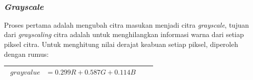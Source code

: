 \begin{adjustbox}{width=1\textwidth}
	\noindent\begin{minipage}{\linewidth}
		\label{fig:SkemaAlurPendeteksianPlat}
	\end{minipage}
\end{adjustbox}\\

\subsubsection{\textit{Grayscale}}
\noindent Proses pertama adalah mengubah citra masukan menjadi citra \textit{grayscale}, tujuan dari \textit{grayscaling} citra adalah untuk menghilangkan informasi warna dari setiap piksel citra. Untuk menghitung nilai derajat keabuan setiap piksel, diperoleh dengan rumus:

\begin{table}[H]
	\begin{adjustbox}{width=1\textwidth}
		\begin{tabular}{|p{13.55cm}|}
			\hline
			\begin{equation}\nonumber
			\begin{aligned}
			\textit{grayvalue} 	&= 0.299 R + 0.587 G + 0.114 B&& \\
			\end{aligned}
			\end{equation}\\
			\hline
		\end{tabular}
	\end{adjustbox}
\end{table}

